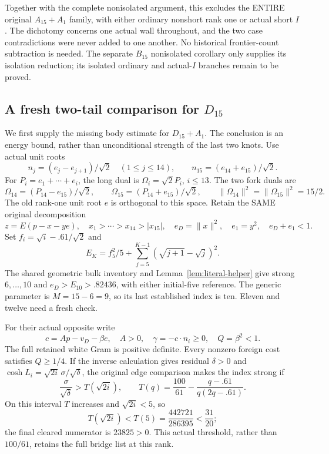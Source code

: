 \documentclass[11pt]{article}
\begin{document}
Together with the complete nonisolated argument, this excludes
the ENTIRE original \(A_{15}+A_1\) family, with either ordinary
nonshort rank one or actual short \(I\).
The dichotomy concerns one actual wall throughout, and the two
case contradictions were never added to one another.
No historical frontier-count subtraction is needed.
The separate \(B_{15}\) nonisolated corollary only supplies its
isolation reduction; its isolated ordinary and actual-\(I\)
branches remain to be proved.
\subsection[A fresh two-tail comparison for D15]{A fresh two-tail comparison for \(D_{15}\)}
\label{app:arithD15body}

We first supply the missing body estimate for \(D_{15}+A_1\).
The conclusion is an energy bound, rather than unconditional
strength of the last two knots.
Use actual unit roots
\[
 n_j=(e_j-e_{j+1})/\sqrt2\quad(1\le j\le14),\qquad
 n_{15}=(e_{14}+e_{15})/\sqrt2 .
\]
For \(P_i=e_1+\cdots+e_i\), the long dual is
\(\Omega_i=\sqrt2P_i\), \(i\le13\).
The two fork duals are
\[
 \Omega_{14}=(P_{14}-e_{15})/\sqrt2,\qquad
 \Omega_{15}=(P_{14}+e_{15})/\sqrt2,\qquad
 \|\Omega_{14}\|^2=\|\Omega_{15}\|^2=15/2 .
\]
The old rank-one unit root \(e\) is orthogonal to this space.
Retain the SAME original decomposition
\[
 z=E(p-x-y e),\quad x_1>\cdots>x_{14}>|x_{15}|,\quad
 e_D=\|x\|^2,\quad e_1=y^2,\quad e_D+e_1<1 .
\]
Set \(f_i=\sqrt i-.61/\sqrt2\) and
\[
 E_K=f_5^2/5+\sum_{j=5}^{K-1}(\sqrt{j+1}-\sqrt j)^2.
\]
The shared geometric bulk inventory and
Lemma~\ref{lem:literal-helper} give strong \(6,\ldots,10\)
and \(e_D>E_{10}>.82436\), with either initial-five reference.
The generic parameter is \(M=15-6=9\), so its last
established index is ten.  Eleven and twelve need a fresh check.

For their actual opposite write
\[
 c=Ap-v_D-\beta e,\quad A>0,\quad
 \gamma=-c\cdot n_i\ge0,\quad Q=\beta^2<1.
\]
The full retained white Gram is positive definite.
Every nonzero foreign cost satisfies \(Q\ge1/4\).
If the inverse calculation gives residual \(\delta>0\) and
\(\cosh L_i=\sqrt{2i}\,\sigma/\sqrt\delta\),
the original edge comparison makes the index strong if
\[
 {\frac{\sigma}{\sqrt\delta}}>T(\sqrt{2i}),\qquad
 T(q)={\frac{100}{61}}-{\frac{q-.61}{q(2q-.61)}}.
\]
On this interval \(T\) increases and \(\sqrt{2i}<5\), so
\[
 T(\sqrt{2i})<T(5)={\frac{442721}{286395}}<{\frac{31}{20}};
\]
the final cleared numerator is \(23825>0\).
This actual threshold, rather than \(100/61\), retains
the full bridge list at this rank.
\end{document}
